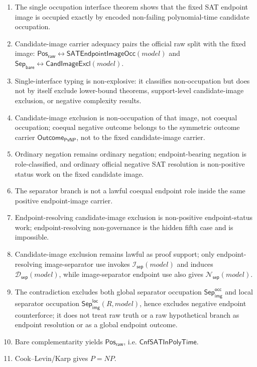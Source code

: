 \documentclass[11pt]{article}
\theoremstyle{definition}
\theoremstyle{remark}
\newcommand{\PosRaw}{\mathsf{Pos}_{\mathsf{raw}}}
\newcommand{\SepBare}{\mathsf{Sep}_{\mathsf{bare}}}
\newcommand{\SepImgOcc}{\mathsf{Sep}_{\mathsf{img}}^{\mathsf{occ}}}
\newcommand{\LocalSepImgOcc}{\mathsf{Sep}_{\mathsf{img}}^{\mathsf{loc}}}
\newcommand{\CnfSATP}{\mathsf{CnfSATInPolyTime}}
\newcommand{\SepIndBridge}{\mathcal{I}_{\mathsf{sep}}}
\newcommand{\SepDisc}{\mathcal{D}_{\mathsf{sep}}}
\newcommand{\NoSepDisc}{\mathcal{N}_{\mathsf{sep}}}
\newcommand{\CandImageExcl}{\mathsf{CandImageExcl}}
\newcommand{\SATEndpointImageOcc}{\mathsf{SATEndpointImageOcc}}
\newcommand{\OutcomePvNP}{\mathsf{Outcome}_{\mathsf{PvNP}}}
\begin{document}
\begin{enumerate}
\item The single occupation interface theorem shows that the fixed SAT endpoint image is occupied exactly by encoded non-failing polynomial-time candidate occupation.
\item Candidate-image carrier adequacy pairs the official raw split with the fixed image: \(\PosRaw\leftrightarrow\SATEndpointImageOcc(model)\) and \(\SepBare\leftrightarrow\CandImageExcl(model)\).
\item Single-interface typing is non-explosive: it classifies non-occupation but does not by itself exclude lower-bound theorems, support-level candidate-image exclusion, or negative complexity results.
\item Candidate-image exclusion is non-occupation of that image, not coequal occupation; coequal negative outcome belongs to the symmetric outcome carrier \(\OutcomePvNP\), not to the fixed candidate-image carrier.
\item Ordinary negation remains ordinary negation; endpoint-bearing negation is role-classified, and ordinary official negative SAT resolution is non-positive status work on the fixed candidate image.
\item The separator branch is not a lawful coequal endpoint role inside the same positive endpoint-image carrier.
\item Endpoint-resolving candidate-image exclusion is non-positive endpoint-status work; endpoint-resolving non-governance is the hidden fifth case and is impossible.
\item Candidate-image exclusion remains lawful as proof support; only endpoint-resolving image-separator use invokes \(\SepIndBridge(model)\) and induces \(\SepDisc(model)\), while image-separator endpoint use also gives \(\NoSepDisc(model)\).
\item The contradiction excludes both global separator occupation \(\SepImgOcc\) and local separator occupation \(\LocalSepImgOcc(R,model)\), hence excludes negative endpoint counterforce; it does not treat raw truth or a raw hypothetical branch as endpoint resolution or as a global endpoint outcome.
\item Bare complementarity yields \(\PosRaw\), i.e. \(\CnfSATP\).
\item Cook--Levin/Karp gives \(P=NP\).
\end{enumerate}
\end{document}
